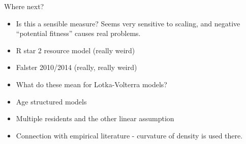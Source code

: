 \documentclass[12pt]{beamer}
\begin{document}
\begin{frame}[t]{Where next?}
  \begin{itemize}
  \item Is this a sensible measure?  Seems very sensitive to scaling,
    and negative ``potential fitness'' causes real problems.
  \item R star 2 resource model (really weird)
  \item Falster 2010/2014 (really, really weird)
  \item What do these mean for Lotka-Volterra models?
  \item Age structured models
  \item Multiple residents and the other linear assumption
  \item Connection with empirical literature - curvature of density is
    used there.
  \end{itemize}
\end{frame}
\end{document}
